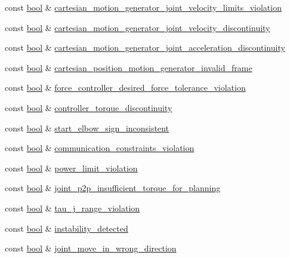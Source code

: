\begin{DoxyCompactItemize}
\item 
const \hyperlink{classbool}{bool} \& \hyperlink{structfranka_1_1Errors_a435d16d62a123bfbf578bc76e3780605}{cartesian\+\_\+motion\+\_\+generator\+\_\+joint\+\_\+velocity\+\_\+limits\+\_\+violation}
\item 
const \hyperlink{classbool}{bool} \& \hyperlink{structfranka_1_1Errors_a1c8c56766fefc19fda5d5de909ca5b37}{cartesian\+\_\+motion\+\_\+generator\+\_\+joint\+\_\+velocity\+\_\+discontinuity}
\item 
const \hyperlink{classbool}{bool} \& \hyperlink{structfranka_1_1Errors_a2e223ef3c771709a6a3f094adf12f9cb}{cartesian\+\_\+motion\+\_\+generator\+\_\+joint\+\_\+acceleration\+\_\+discontinuity}
\item 
const \hyperlink{classbool}{bool} \& \hyperlink{structfranka_1_1Errors_aa1952c6da2f81578861a19b947c97b85}{cartesian\+\_\+position\+\_\+motion\+\_\+generator\+\_\+invalid\+\_\+frame}
\item 
const \hyperlink{classbool}{bool} \& \hyperlink{structfranka_1_1Errors_ae474f20a64b2585dbe6496966dddff0a}{force\+\_\+controller\+\_\+desired\+\_\+force\+\_\+tolerance\+\_\+violation}
\item 
const \hyperlink{classbool}{bool} \& \hyperlink{structfranka_1_1Errors_af40d93759ace9ee6026208110692a732}{controller\+\_\+torque\+\_\+discontinuity}
\item 
const \hyperlink{classbool}{bool} \& \hyperlink{structfranka_1_1Errors_aa6de1956ac056792a1dea6b9ddd52a50}{start\+\_\+elbow\+\_\+sign\+\_\+inconsistent}
\item 
const \hyperlink{classbool}{bool} \& \hyperlink{structfranka_1_1Errors_a4d17af86c1ebb698c218796fa15f9bd7}{communication\+\_\+constraints\+\_\+violation}
\item 
const \hyperlink{classbool}{bool} \& \hyperlink{structfranka_1_1Errors_a6c4d8cb1fb314567ebd07a6195b840f5}{power\+\_\+limit\+\_\+violation}
\item 
const \hyperlink{classbool}{bool} \& \hyperlink{structfranka_1_1Errors_a1c78be870253b510a4516acf14c2d3e3}{joint\+\_\+p2p\+\_\+insufficient\+\_\+torque\+\_\+for\+\_\+planning}
\item 
const \hyperlink{classbool}{bool} \& \hyperlink{structfranka_1_1Errors_a1491f8428341649befa3d088aebb317e}{tau\+\_\+j\+\_\+range\+\_\+violation}
\item 
const \hyperlink{classbool}{bool} \& \hyperlink{structfranka_1_1Errors_aebb701987262097687d21b3cf1bc8930}{instability\+\_\+detected}
\item 
const \hyperlink{classbool}{bool} \& \hyperlink{structfranka_1_1Errors_a7d3a6480cbe572fd46e579b43732edc9}{joint\+\_\+move\+\_\+in\+\_\+wrong\+\_\+direction}
\end{DoxyCompactItemize}
